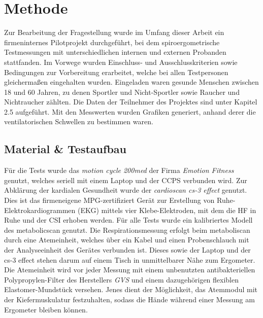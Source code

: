 \chapter{Methode}
%
Zur Bearbeitung der Fragestellung wurde im Umfang dieser Arbeit ein firmeninternes Pilotprojekt durchgeführt, bei dem spiroergometrische Testmessungen mit unterschiedlichen internen und externen Probanden stattfanden. Im Vorwege wurden Einschluss- und Ausschlusskriterien sowie Bedingungen zur Vorbereitung erarbeitet, welche bei allen Testpersonen gleichermaßen eingehalten wurden. Eingeladen waren gesunde Menschen zwischen 18 und 60 Jahren, zu denen Sportler und Nicht-Sportler sowie Raucher und Nichtraucher zählten. Die Daten der Teilnehmer des Projektes sind unter Kapitel 2.5 aufgeführt. Mit den Messwerten wurden Grafiken generiert, anhand derer die ventilatorischen Schwellen zu bestimmen waren.
%
\section{Material \& Testaufbau}
%
Für die Tests wurde das \textsl{motion cycle 200med} der Firma \textsl{Emotion Fitness} genutzt, welches seriell mit einem Laptop und der \acs{CCPS} verbunden wird. Zur Abklärung der kardialen Gesundheit wurde der \textsl{cardioscan cs-3 effect} genutzt. Dies ist das firmeneigene MPG-zertifiziert Gerät zur Erstellung von Ruhe-Elektrokardiogrammen (\acs{EKG}) mittels vier Klebe-Elektroden, mit dem die \ac{HF} in Ruhe und der \ac{CSI} erhoben werden. Für alle Tests wurde ein kalibriertes Modell des metabolicscan genutzt. Die Respirationsmessung erfolgt beim metaboliscan durch eine Atemeinheit, welches über ein Kabel und einen Probenschlauch mit der Analyseeinheit des Gerätes verbunden ist. Dieses sowie der Laptop und der cs-3 effect stehen darum auf einem Tisch in unmittelbarer Nähe zum Ergometer. Die Atemeinheit wird vor jeder Messung mit einem unbenutzten antibakteriellen Polypropylen-Filter des Herstellers \textsl{GVS} und einem dazugehörigen flexiblen Elastomer-Mundstück versehen. Jenes dient der Möglichkeit, das Atemmodul mit der Kiefermuskulatur festzuhalten, sodass die Hände während einer Messung am Ergometer bleiben können.
%
